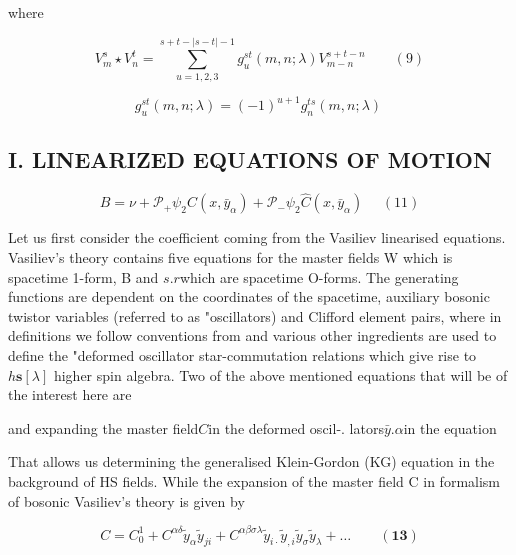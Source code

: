 \documentclass{article}
\begin{document}
where


\begin{equation}
V _ { m } ^ { s } \star V _ { n } ^ { t } = \sum _ { u = 1, 2, 3 } ^ { s + t - | s - t | - 1 } g _ { u } ^ { s t } ( m, n ; \lambda ) V _ { m - n } ^ { s + t - n } \qquad ( 9 )
\end{equation}


\begin{equation}
g _ { u } ^ { s t } ( m, n ; \lambda ) = ( - 1 ) ^ { u + 1 } g _ { n } ^ { t s } ( m, n ; \lambda ) ~
\end{equation}


\subsection*{I. LINEARIZED EQUATIONS OF MOTION}


\begin{equation}
B = \nu + \mathcal { P } _ { + } \psi _ { 2 } C ( x, \bar { y } _ { \alpha } ) + \mathcal { P } _ { - } \psi _ { 2 } \hat { C } ( x, \bar { y } _ { \alpha } ) ~ ~ ~ ~ ~ ~ ( 1 1 )
\end{equation}


Let us first consider the coefficient coming from the
Vasiliev linearised equations. Vasiliev's theory contains
five equations for the master fields W which is spacetime
1-form, B and $s . { r }$which are spacetime O-forms. The generating functions are dependent on the coordinates of the
spacetime, auxiliary bosonic twistor variables (referred
to as "oscillators) and Clifford element pairs, where in
definitions we follow conventions from
and various other ingredients are used to define the "deformed oscillator star-commutation relations which give
rise to$h \mathbf { s } [ \lambda ]$ higher spin algebra. Two of the above mentioned equations that will be of the interest here are


and expanding the master field$C$in the deformed oscil-.
lators$\bar { y } . { \alpha }$in the equation


That allows us determining the generalised Klein-Gordon
(KG) equation in the background of HS fields. While the
expansion of the master field C in formalism of bosonic
Vasiliev's theory is given by


\begin{equation}
C = C _ { 0 } ^ { 1 } + C ^ { \alpha \delta } \tilde { y } _ { \alpha } \tilde { y } _ { j i } + C ^ { \alpha \beta \sigma \lambda } \tilde { y } _ { i \cdot } \tilde { y } _ {, i } \tilde { y } _ { \sigma } \tilde { y } _ { \lambda } + \dots \qquad ( \mathbf { 1 3 } )
\end{equation}
\end{document}
